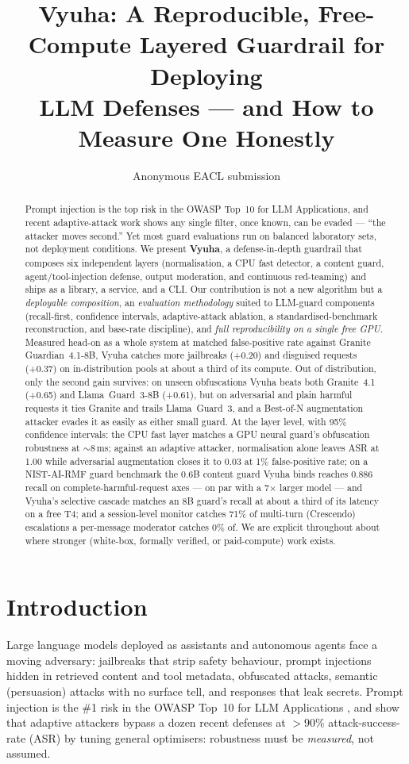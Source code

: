 \documentclass[11pt]{article}
\title{Vyuha: A Reproducible, Free-Compute Layered Guardrail for Deploying\\
LLM Defenses --- and How to Measure One Honestly}
\author{Anonymous EACL submission}
\begin{document}
\maketitle

\begin{abstract}
Prompt injection is the top risk in the OWASP Top~10 for LLM Applications, and recent
adaptive-attack work shows any single filter, once known, can be evaded --- ``the attacker moves
second.'' Yet most guard evaluations run on balanced laboratory sets, not deployment conditions.
We present \textbf{Vyuha}, a defense-in-depth guardrail that composes six independent layers
(normalisation, a CPU fast detector, a content guard, agent/tool-injection defense, output
moderation, and continuous red-teaming) and ships as a library, a service, and a CLI. Our
contribution is not a new algorithm but a \emph{deployable composition}, an
\emph{evaluation methodology} suited to LLM-guard components (recall-first, confidence intervals,
adaptive-attack ablation, a standardised-benchmark reconstruction, and base-rate discipline), and
\emph{full reproducibility on a single free GPU}. Measured head-on as a whole system at matched false-positive rate against Granite Guardian~4.1-8B,
Vyuha catches more jailbreaks (+0.20) and disguised requests (+0.37) on in-distribution pools at about a
third of its compute. Out of distribution, only the second gain survives: on unseen obfuscations Vyuha
beats both Granite~4.1 (+0.65) and Llama~Guard~3-8B (+0.61), but on adversarial and plain harmful
requests it ties Granite and trails Llama~Guard~3, and a Best-of-N augmentation attacker evades it as
easily as either small guard. At the layer level, with 95\%
confidence intervals: the CPU fast layer matches a GPU neural guard's obfuscation robustness at
$\sim$8\,ms; against an adaptive attacker, normalisation alone leaves ASR at 1.00 while adversarial
augmentation closes it to 0.03 at 1\% false-positive rate; on a NIST-AI-RMF guard benchmark the
0.6B content guard Vyuha binds reaches 0.886 recall on complete-harmful-request axes --- on par with a
7$\times$ larger model --- and Vyuha's selective cascade matches an 8B guard's recall at about a third
of its latency on a free T4; and a session-level monitor catches 71\% of multi-turn (Crescendo) escalations a
per-message moderator catches 0\% of. We are explicit throughout about where stronger
(white-box, formally verified, or paid-compute) work exists.
\end{abstract}

\section{Introduction}
Large language models deployed as assistants and autonomous agents face a moving adversary:
jailbreaks that strip safety behaviour, prompt injections hidden in retrieved content and tool
metadata, obfuscated attacks, semantic (persuasion) attacks with no surface tell,
and responses that leak secrets. Prompt injection is the \#1 risk in the OWASP Top~10 for LLM
Applications \citep{owasp-llm}, and \citet{attacker-second} show that adaptive attackers bypass a
dozen recent defenses at $>$90\% attack-success-rate (ASR) by tuning general optimisers: robustness
must be \emph{measured}, not assumed.
\end{document}
